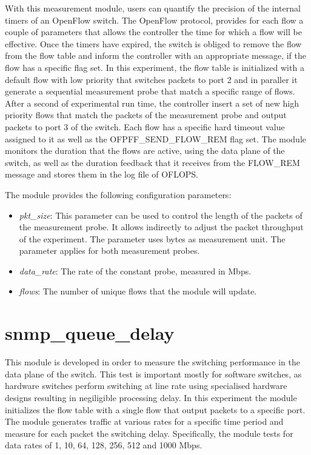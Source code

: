\documentclass{book}
\begin{document}
With this measurement module, users can quantify the precision of the internal
timers of an OpenFlow switch. The OpenFlow protocol, provides for each flow a
couple of parameters that allows the controller the time for which a flow will be
effective. Once the timers have expired, the switch is obliged to remove the
flow from the flow table and inform the controller with an appropriate 
message, if the flow has a specific flag set. In this experiment, the flow table is
initialized with a default flow with low priority that switches packets to port
2 and in paraller it generate a sequential measurement probe that match a specific
range of flows. After a second of experimental run time, the controller insert a
set of new high priority flows that match the packets of the measurement probe 
and output packets to port 3 of the switch. Each flow has a specific hard timeout 
value assigned to it as well as the OFPFF\_SEND\_FLOW\_REM flag set. The module monitors 
the duration that the flows are active, using the data plane of the switch, as 
well as the duration feedback that it receives from the FLOW\_REM message and
stores them in the log file of OFLOPS. 

The module provides the following configuration parameters:
\begin{itemize}
\item \emph{pkt\_size}: This parameter can be used to control the length of the
packets of the measurement probe. It allows indirectly to adjust the packet
throughput of the experiment. The parameter uses bytes as measurement unit.
The parameter applies for both measurement probes.
\item \emph{data\_rate}: The rate of the constant probe, measured in Mbps.
\item \emph{flows}:  The number of unique flows that the module will
update.
\end{itemize}

\section{snmp\_queue\_delay}

This module is developed in order to measure the switching performance in the
data plane of the switch. This test is important mostly for software
switches, as hardware switches perform switching at line rate using
specialised hardware designs resulting in negiligible processing delay. 
In this experiment the module initializes the flow table with a single
flow that output packets to a specific port. The module generates traffic at
various rates for a specific time period and measure for each packet the switching delay. 
Specifically, the module tests for data rates of 1, 10, 64, 128, 256, 512 and 1000 Mbps.
\end{document}
